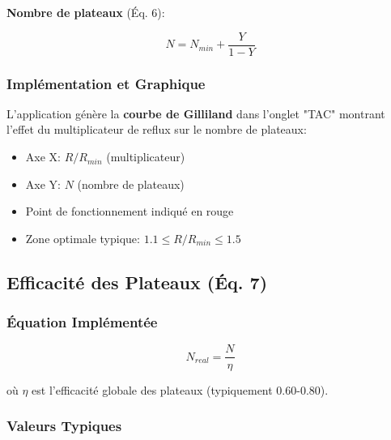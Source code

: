 \documentclass[11pt,a4paper]{article}
\begin{document}
\textbf{Nombre de plateaux} (Éq. 6):

\begin{tcolorbox}[colback=yellow!10,colframe=orange!50!black,title=Équation 6: Gilliland - N]
\begin{equation}
N = N_{min} + \frac{Y}{1-Y}
\end{equation}
\end{tcolorbox}

\subsubsection{Implémentation et Graphique}

L'application génère la \textbf{courbe de Gilliland} dans l'onglet "TAC" montrant l'effet du multiplicateur de reflux sur le nombre de plateaux:

\begin{itemize}[leftmargin=*]
    \item Axe X: $R/R_{min}$ (multiplicateur)
    \item Axe Y: $N$ (nombre de plateaux)
    \item Point de fonctionnement indiqué en rouge
    \item Zone optimale typique: $1.1 \leq R/R_{min} \leq 1.5$
\end{itemize}

\subsection{Efficacité des Plateaux (Éq. 7)}

\subsubsection{Équation Implémentée}

\begin{tcolorbox}[colback=yellow!10,colframe=orange!50!black,title=Équation 7: Efficacité]
\begin{equation}
N_{real} = \frac{N}{\eta}
\end{equation}
\end{tcolorbox}

où $\eta$ est l'efficacité globale des plateaux (typiquement 0.60-0.80).

\subsubsection{Valeurs Typiques}
\end{document}
